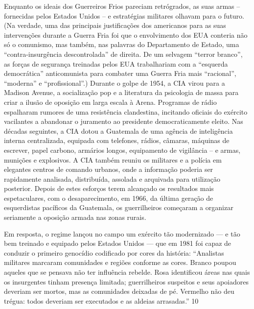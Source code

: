  
\par
 
Enquanto os ideais dos Guerreiros Frios pareciam retrógrados, as suas armas – fornecidas pelos Estados Unidos – e estratégias militares olhavam para o futuro. (Na verdade, uma das principais justificações dos americanos para as suas intervenções durante a Guerra Fria foi que o envolvimento dos EUA conteria não só o comunismo, mas também, nas palavras do Departamento de Estado, uma “contra-insurgência descontrolada” de direita. De um selvagem “terror branco”, as forças de segurança treinadas pelos EUA trabalhariam com a “esquerda democrática” anticomunista para combater uma Guerra Fria mais “racional”, “moderna” e “profissional”.) Durante o golpe de 1954, a CIA virou para a Madison Avenue, a socialização pop e a literatura da psicologia de massa para criar a ilusão de oposição em larga escala à Arena. Programas de rádio espalharam rumores de uma resistência clandestina, incitando oficiais do exército vacilantes a abandonar o juramento ao presidente democraticamente eleito. Nas décadas seguintes, a CIA dotou a Guatemala de uma agência de inteligência interna centralizada, equipada com telefones, rádios, câmaras, máquinas de escrever, papel carbono, armários longos, equipamento de vigilância – e armas, munições e explosivos. A CIA também reuniu os militares e a polícia em elegantes centros de comando urbanos, onde a informação poderia ser rapidamente analisada, distribuída, assolada e arquivada para utilização posterior. Depois de estes esforços terem alcançado os resultados mais espetaculares, com o desaparecimento, em 1966, da última geração de esquerdistas pacíficos da Guatemala, os guerrilheiros começaram a organizar seriamente a oposição armada nas zonas rurais.
 
\par
 
Em resposta, o regime lançou no campo um exército tão modernizado — e tão bem treinado e equipado pelos Estados Unidos — que em 1981 foi capaz de conduzir o primeiro genocídio codificado por cores da história: “Analistas militares marcaram comunidades e regiões conforme as cores. Branco poupou aqueles que se pensava não ter influência rebelde. Rosa identificou áreas nas quais os insurgentes tinham presença limitada; guerrilheiros suspeitos e seus apoiadores deveriam ser mortos, mas as comunidades deixadas de pé. Vermelho não deu trégua: todos deveriam ser executados e as aldeias arrasadas.”
 {\color{blue} 10}  

 
\par
 
